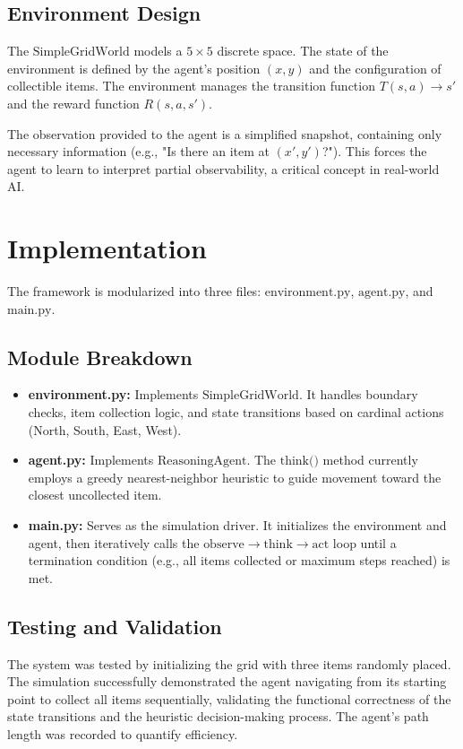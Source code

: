 \documentclass[11pt,a4paper]{article}
\begin{document}
\subsection{Environment Design}
The $\text{SimpleGridWorld}$ models a $5 \times 5$ discrete space. The state of the environment is defined by the agent's position $(x, y)$ and the configuration of collectible items. The environment manages the transition function $T(s, a) \rightarrow s'$ and the reward function $R(s, a, s')$.

The observation provided to the agent is a simplified snapshot, containing only necessary information (e.g., "Is there an item at $(x', y')$?"). This forces the agent to learn to interpret partial observability, a critical concept in real-world AI.

\section{Implementation}
The framework is modularized into three files: $\text{environment.py}$, $\text{agent.py}$, and $\text{main.py}$.

\subsection{Module Breakdown}
\begin{itemize}
    \item \textbf{environment.py:} Implements $\text{SimpleGridWorld}$. It handles boundary checks, item collection logic, and state transitions based on cardinal actions (North, South, East, West).
    \item \textbf{agent.py:} Implements $\text{ReasoningAgent}$. The $\text{think()}$ method currently employs a greedy nearest-neighbor heuristic to guide movement toward the closest uncollected item.
    \item \textbf{main.py:} Serves as the simulation driver. It initializes the environment and agent, then iteratively calls the $\text{observe} \rightarrow \text{think} \rightarrow \text{act}$ loop until a termination condition (e.g., all items collected or maximum steps reached) is met.
\end{itemize}

\subsection{Testing and Validation}
The system was tested by initializing the grid with three items randomly placed. The simulation successfully demonstrated the agent navigating from its starting point to collect all items sequentially, validating the functional correctness of the state transitions and the heuristic decision-making process. The agent's path length was recorded to quantify efficiency.
\end{document}
